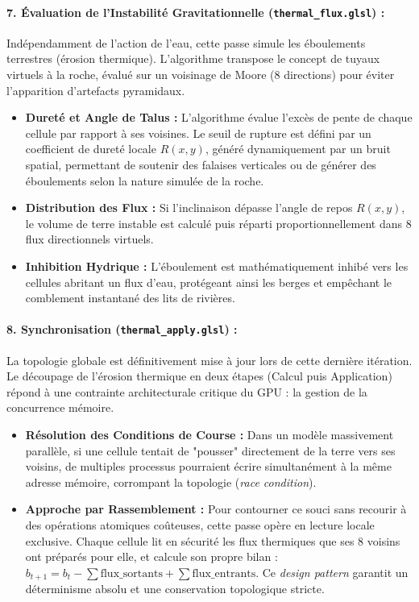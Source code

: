 \documentclass[10pt,twocolumn,a4paper]{article}
\begin{document}
\paragraph{7. Évaluation de l'Instabilité Gravitationnelle (\texttt{thermal\_flux.glsl}) :}
Indépendamment de l'action de l'eau, cette passe simule les éboulements terrestres (érosion thermique). L'algorithme transpose le concept de tuyaux virtuels à la roche, évalué sur un voisinage de Moore (8 directions) \cite{Jako11} pour éviter l'apparition d'artefacts pyramidaux.
\begin{itemize}
    \item \textbf{Dureté et Angle de Talus :} L'algorithme évalue l'excès de pente de chaque cellule par rapport à ses voisines. Le seuil de rupture est défini par un coefficient de dureté locale $R(x,y)$, généré dynamiquement par un bruit spatial, permettant de soutenir des falaises verticales ou de générer des éboulements selon la nature simulée de la roche.
    \item \textbf{Distribution des Flux :} Si l'inclinaison dépasse l'angle de repos $R(x,y)$, le volume de terre instable est calculé puis réparti proportionnellement dans 8 flux directionnels virtuels.
    \item \textbf{Inhibition Hydrique :} L'éboulement est mathématiquement inhibé vers les cellules abritant un flux d'eau, protégeant ainsi les berges et empêchant le comblement instantané des lits de rivières.
\end{itemize}

\paragraph{8. Synchronisation (\texttt{thermal\_apply.glsl}) :}
La topologie globale est définitivement mise à jour lors de cette dernière itération. Le découpage de l'érosion thermique en deux étapes (Calcul puis Application) répond à une contrainte architecturale critique du GPU : la gestion de la concurrence mémoire.
\begin{itemize}
    \item \textbf{Résolution des Conditions de Course :} Dans un modèle massivement parallèle, si une cellule tentait de "pousser" directement de la terre vers ses voisins, de multiples processus pourraient écrire simultanément à la même adresse mémoire, corrompant la topologie (\textit{race condition}).
    \item \textbf{Approche par Rassemblement :} Pour contourner ce souci sans recourir à des opérations atomiques coûteuses, cette passe opère en lecture locale exclusive. Chaque cellule lit en sécurité les flux thermiques que ses 8 voisins ont préparés pour elle, et calcule son propre bilan : $b_{t+1} = b_t - \sum \text{flux\_sortants} + \sum \text{flux\_entrants}$. Ce \textit{design pattern} garantit un déterminisme absolu et une conservation topologique stricte.
\end{itemize}
\end{document}

